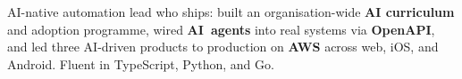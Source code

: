 AI-native automation lead who ships: built an organisation-wide \textbf{AI curriculum} and adoption programme, wired \textbf{AI~agents} into real systems via \textbf{OpenAPI}, and led three AI-driven products to production on \textbf{AWS} across web, iOS, and Android. Fluent in TypeScript, Python, and Go.

